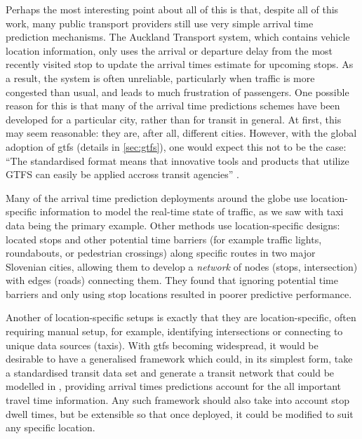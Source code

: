 Perhaps the most interesting point about all of this is that, despite all of this work, many public transport providers still use very simple arrival time prediction mechanisms. The Auckland Transport system, which contains \rt{} vehicle location information, only uses the arrival or departure delay from the most recently visited stop to update the arrival times estimate for upcoming stops. As a result, the system is often unreliable, particularly when traffic is more congested than usual, and leads to much frustration of passengers. One possible reason for this is that many of the arrival time predictions schemes have been developed for a particular city, rather than for transit in general. At first, this may seem reasonable: they are, after all, different cities. However, with the global adoption of \gls{gtfs} (details in \cref{sec:gtfs}), one would expect this not to be the case: ``The standardised format means that innovative tools and products that utilize GTFS can easily be applied accross transit agencies'' \citep[26]{TCRP_2020}.



Many of the arrival time prediction deployments around the globe use location-specific information to model the real-time state of traffic, as we saw with taxi data being the primary example. Other methods use location-specific designs: \citet{Celan_2017,Celan_2018} located stops and other potential time barriers (for example traffic lights, roundabouts, or pedestrian crossings) along specific routes in two major Slovenian cities, allowing them to develop a \emph{network} of nodes (stops, intersection) with edges (roads) connecting them. They found that ignoring potential time barriers and only using stop locations resulted in poorer predictive performance. 


Another  of location-specific setups is exactly that they are location-specific, often requiring manual setup, for example, identifying intersections or connecting to unique data sources (taxis). With \gls{gtfs} becoming widespread, it would be desirable to have a generalised framework which could, in its simplest form, take a standardised transit data set and generate a transit network that could be modelled in \rt{}, providing arrival times predictions account for the all important travel time information. Any such framework should also take into account stop dwell times, but be extensible so that once deployed, it could be modified to suit any specific location. 




